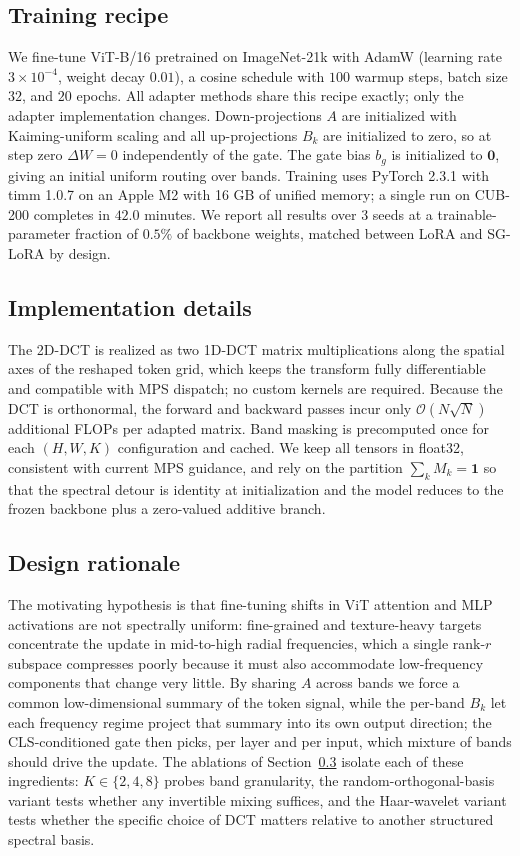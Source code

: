 \documentclass{article}
\begin{document}
\subsection{Training recipe}

We fine-tune ViT-B/16 pretrained on ImageNet-21k with AdamW (learning rate $3 \times 10^{-4}$, weight decay $0.01$), a cosine schedule with $100$ warmup steps, batch size $32$, and $20$ epochs. All adapter methods share this recipe exactly; only the adapter implementation changes. Down-projections $A$ are initialized with Kaiming-uniform scaling and all up-projections $B_k$ are initialized to zero, so at step zero $\Delta W = 0$ independently of the gate. The gate bias $b_g$ is initialized to $\mathbf{0}$, giving an initial uniform routing over bands. Training uses PyTorch 2.3.1 with timm 1.0.7 on an Apple M2 with 16 GB of unified memory; a single run on CUB-200 completes in $42.0$ minutes. We report all results over $3$ seeds at a trainable-parameter fraction of $0.5\%$ of backbone weights, matched between LoRA and SG-LoRA by design.

\subsection{Implementation details}

The 2D-DCT is realized as two 1D-DCT matrix multiplications along the spatial axes of the reshaped token grid, which keeps the transform fully differentiable and compatible with MPS dispatch; no custom kernels are required. Because the DCT is orthonormal, the forward and backward passes incur only $\mathcal{O}(N \sqrt{N})$ additional FLOPs per adapted matrix. Band masking is precomputed once for each $(H, W, K)$ configuration and cached. We keep all tensors in float32, consistent with current MPS guidance, and rely on the partition $\sum_k M_k = \mathbf{1}$ so that the spectral detour is identity at initialization and the model reduces to the frozen backbone plus a zero-valued additive branch.

\subsection{Design rationale}

The motivating hypothesis is that fine-tuning shifts in ViT attention and MLP activations are not spectrally uniform: fine-grained and texture-heavy targets concentrate the update in mid-to-high radial frequencies, which a single rank-$r$ subspace compresses poorly because it must also accommodate low-frequency components that change very little. By sharing $A$ across bands we force a common low-dimensional summary of the token signal, while the per-band $B_k$ let each frequency regime project that summary into its own output direction; the CLS-conditioned gate then picks, per layer and per input, which mixture of bands should drive the update. The ablations of Section~\ref{} isolate each of these ingredients: $K \in \{2, 4, 8\}$ probes band granularity, the random-orthogonal-basis variant tests whether any invertible mixing suffices, and the Haar-wavelet variant tests whether the specific choice of DCT matters relative to another structured spectral basis.
\end{document}
